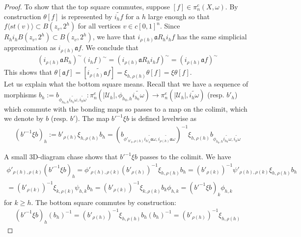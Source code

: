 \documentclass[a4paper,11pt]{article}
\theoremstyle{definition}
\theoremstyle{plain}
\theoremstyle{remark}
\begin{document}
{\begin{proof}
To show that the top square commutes, suppose $[f]\in \pi_{n}^c(X,\omega)$. By construction $\theta[f]$ is represented by $\widetilde{i_{h}f}$ for a $h$ large enough so that $f\langle st(v)\rangle \subset B(z_v,2^h)$ for all vertices $v\in c[0,1]^n$. Since $R_{h}i_{h}B(z_v,2^h)\subset B(z_v,2^h)$, we have that 
$i_{\rho(h)} \mathfrak{a} R_{h}i_{h}f$ has the same simplicial approximation as $i_{\rho(h)} \mathfrak{a} f$. We conclude that 
\begin{align*}
(i_{\rho(h)} \mathfrak{a} R_{h})^{\sim}(i_{h}f)^{\sim} = (i_{\rho(h)} \mathfrak{a} R_{h}i_{h}f)^{\sim} = (i_{\rho(h)} \mathfrak{a} f)^{\sim}
\end{align*}
This shows that $\theta[\mathfrak{a}f]=[\widetilde{i_{\rho(h)}\mathfrak{a}f}] = \xi_{h,\rho(h)}\theta[f] = \xi\theta[f]$. \\

Let us explain what the bottom square means. Recall that we have a sequence of morphisms $b_{h}:=b_{\phi_{h_0,h}\widetilde{i_{h_0}\omega},\widetilde{i_{h}\omega}}: \pi_{n}^{e}(|\mathcal{U}_{h}|, \phi_{h_0,h}\widetilde{i_{h_0}\omega})\rightarrow \pi_{n}^e(|\mathcal{U}_{h}|,\widetilde{i_{h}\omega})$ (resp. $b'_{h}$) which commute with the bonding maps so passes to a map on the colimit, which we denote by $b$ (resp. $b'$). The map $b'^{-1}\xi b$ is defined levelwise as 
\begin{align*}
(b'^{-1}\xi b)_{h}:= b'_{\rho(h)} \xi_{h,\rho(h)} b_{h}=(b_{\phi'_{h'_0,\rho(h)}\widetilde{i_{h'_0}\mathfrak{a}\omega},\widetilde{i_{\rho(h)}\mathfrak{a}\omega}} )^{-1}\xi_{h,\rho(h)}b_{\phi_{h_0,h}\widetilde{i_{h_0}\omega},\widetilde{i_{h}\omega}}
\end{align*}


A small 3D-diagram chase shows that $b'^{-1}\xi b$ passes to the colimit. We have
\begin{align*}
\phi'_{\rho(h),\rho(k)}(b'^{-1}\xi b)_{h} = \phi'_{\rho(h),\rho(k)} (b'_{\rho(h)})^{-1} \xi_{h,\rho(h)} b_{h} = (b'_{\rho(k)})^{-1} \psi'_{\rho(h),\rho(k)}   \xi_{h,\rho(h)} b_{h} \\= (b'_{\rho(k)})^{-1}   \xi_{k,\rho(k)} \psi_{h,k}  b_{h} = (b'_{\rho(k)})^{-1}   \xi_{k,\rho(k)}   b_{k} \phi_{h,k} = (b'^{-1}\xi b)_{k}\phi_{h,k} 
\end{align*}
for $k\geq h$. The bottom square commutes by construction:
\begin{align*}
(b'^{-1}\xi b)_{h} (b_{h})^{-1}= (b'_{\rho(h)})^{-1} \xi_{h,\rho(h)} b_{h}(b_{h})^{-1} =(b'_{\rho(h)})^{-1}\xi_{h,\rho(h)}
\end{align*}


\end{proof}}
\end{document}
